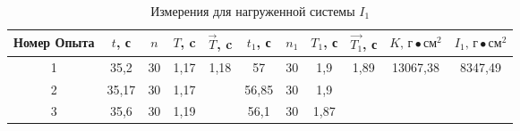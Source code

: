 \begin{table}
    \centering
    
    \begin{tabular}{|c|c|c|c|c|c|c|c|c|c|c|}
        \hline
        Номер Опыта & $t$, с & $n$ & $T$, c &     $\vec{T}$, c      & $t_1$, с & $n_1$ & $T_1$, с & $\vec{T_1}$, с         & $K \text{, г}\bullet\text{см}^2$ & $I_1\text{, г}\bullet\text{см}^2$ \\
        \hline
                  1 &  35,2  & 30  &  1,17  & \multirow{3}{*}{1,18} &   57     &  30   &  1,9     & \multirow{3}{*}{1,89}  &     \multirow{3}{*}{13067,38 }   & \multirow{3}{*}{8347,49}          \\
        \hline
                  2 &  35,17 & 30  &  1,17  &                       &   56,85  &  30   &  1,9     &                        &                                  &                                   \\
        \hline
                  3 &  35,6  & 30  &  1,19  &                       &   56,1   &  30   &  1,87    &                        &                                  &                                   \\
        \hline
    \end{tabular}

    \caption{Измерения для нагруженной системы $I_1$} \label{table-2}
\end{table}